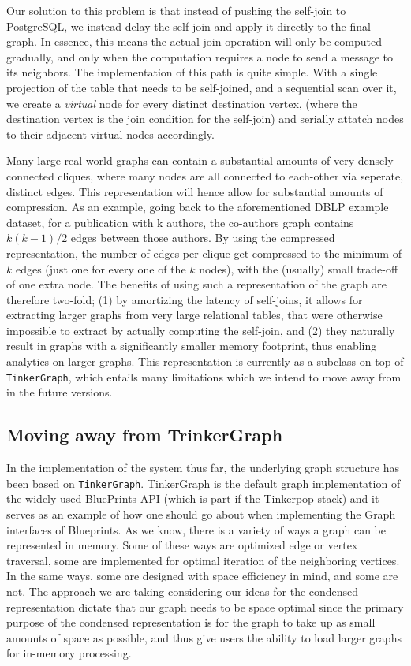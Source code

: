 \documentclass[11pt,letterpaper]{article}
\begin{document}
Our solution to this problem is that instead of pushing the self-join to PostgreSQL, we instead delay the self-join and apply it directly to the final graph. In essence, this means the actual join operation will only be computed gradually, and only when the computation requires a node to send a message to its neighbors. The implementation of this path is quite simple. With a single projection of the table that needs to be self-joined, and a sequential scan over it, we create a \textit{virtual} node for every distinct destination vertex, (where the destination vertex is the join condition for the self-join) and serially attatch nodes to their adjacent virtual nodes accordingly.

Many large real-world graphs can contain a substantial amounts of very densely connected cliques, where many nodes are all connected to each-other via seperate, distinct edges. This representation will hence allow for substantial amounts of compression. As an example, going back to the aforementioned DBLP example dataset, for a publication with k authors, the co-authors graph contains $k(k-1)/2$ edges between those authors. By using the compressed representation, the number of edges per clique get compressed to the minimum of $k$ edges (just one for every one of the $k$ nodes), with the (usually) small trade-off of one extra node. The benefits of using such a representation of the graph are therefore two-fold; (1) by amortizing the latency of  self-joins, it allows for extracting larger graphs from very large relational tables, that were otherwise impossible to extract by actually computing the self-join, and (2) they naturally result in graphs with a significantly smaller memory footprint, thus enabling analytics on larger graphs. This representation is currently as a subclass on top of \texttt{TinkerGraph}, which entails many limitations which we intend to move away from in the future versions.


\subsection*{Moving away from TrinkerGraph}

In the implementation of the system thus far, the underlying graph structure has been based on \texttt{TinkerGraph}. TinkerGraph is the default graph implementation of the widely used BluePrints API (which is part if the Tinkerpop \cite{tinkerpop} stack) and it serves as an example of how one should go about when implementing the Graph interfaces of Blueprints.
As we know, there is a variety of ways a graph can be represented in memory. Some of these ways are optimized edge or vertex traversal, some are implemented for optimal iteration of the neighboring vertices. In the same ways, some are designed with space efficiency in mind, and some are not. The approach we are taking considering our ideas for the condensed representation dictate that our graph needs to be space optimal since  the primary purpose of the condensed representation is for the graph to take up as small amounts of space as possible, and thus give users the ability to load larger graphs for in-memory processing.
\end{document}
